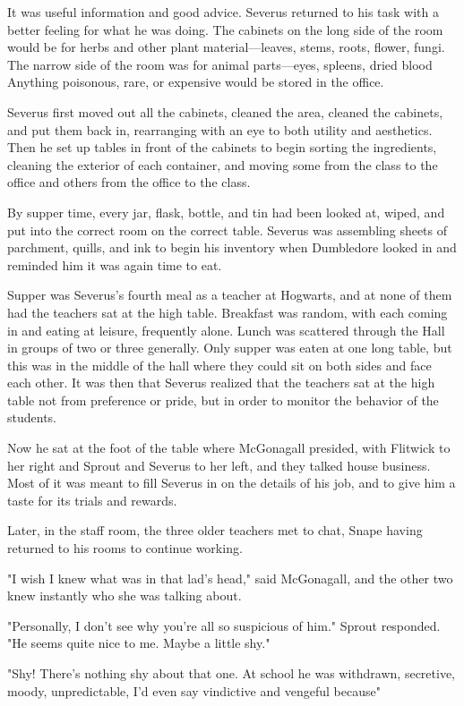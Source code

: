 It was useful information and good advice. Severus returned to his task with a better feeling for what he was doing. The cabinets on the long side of the room would be for herbs and other plant material—leaves, stems, roots, flower, fungi. The narrow side of the room was for animal parts—eyes, spleens, dried blood{\el} Anything poisonous, rare, or expensive would be stored in the office.

Severus first moved out all the cabinets, cleaned the area, cleaned the cabinets, and put them back in, rearranging with an eye to both utility and aesthetics. Then he set up tables in front of the cabinets to begin sorting the ingredients, cleaning the exterior of each container, and moving some from the class to the office and others from the office to the class.

By supper time, every jar, flask, bottle, and tin had been looked at, wiped, and put into the correct room on the correct table. Severus was assembling sheets of parchment, quills, and ink to begin his inventory when Dumbledore looked in and reminded him it was again time to eat.

Supper was Severus's fourth meal as a teacher at Hogwarts, and at none of them had the teachers sat at the high table. Breakfast was random, with each coming in and eating at leisure, frequently alone. Lunch was scattered through the Hall in groups of two or three generally. Only supper was eaten at one long table, but this was in the middle of the hall where they could sit on both sides and face each other. It was then that Severus realized that the teachers sat at the high table not from preference or pride, but in order to monitor the behavior of the students.

Now he sat at the foot of the table where McGonagall presided, with Flitwick to her right and Sprout and Severus to her left, and they talked house business. Most of it was meant to fill Severus in on the details of his job, and to give him a taste for its trials and rewards.

Later, in the staff room, the three older teachers met to chat, Snape having returned to his rooms to continue working.

"I wish I knew what was in that lad's head," said McGonagall, and the other two knew instantly who she was talking about.

"Personally, I don't see why you're all so suspicious of him." Sprout responded. "He seems quite nice to me. Maybe a little shy."

"Shy! There's nothing shy about that one. At school he was withdrawn, secretive, moody, unpredictable, I'd even say vindictive and vengeful because{\el}"

